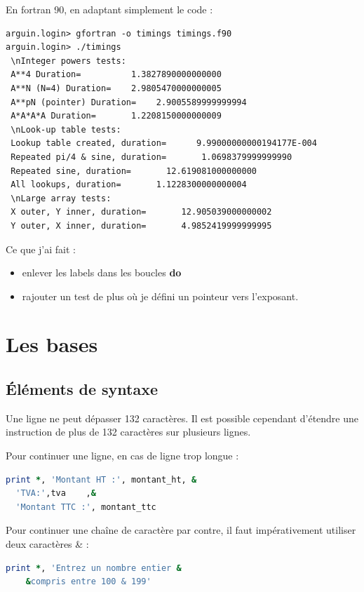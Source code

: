 \documentclass[a4paper,twoside]{article}
\begin{document}
En fortran 90, en adaptant simplement le code :
\begin{verbatim}
arguin.login> gfortran -o timings timings.f90
arguin.login> ./timings 
 \nInteger powers tests:
 A**4 Duration=          1.3827890000000000     
 A**N (N=4) Duration=    2.9805470000000005     
 A**pN (pointer) Duration=    2.9005589999999994     
 A*A*A*A Duration=       1.2208150000000009     
 \nLook-up table tests:
 Lookup table created, duration=      9.99000000000194177E-004
 Repeated pi/4 & sine, duration=       1.0698379999999990     
 Repeated sine, duration=       12.619081000000000     
 All lookups, duration=       1.1228300000000004     
 \nLarge array tests:
 X outer, Y inner, duration=       12.905039000000002     
 Y outer, X inner, duration=       4.9852419999999995  
\end{verbatim}
Ce que j'ai fait : 
\begin{itemize}
\item enlever les labels dans les boucles \textbf{do}
\item rajouter un test de plus où je défini un pointeur vers l'exposant. 
\end{itemize}



\section{Les bases}
\subsection{Éléments de syntaxe}
Une ligne ne peut dépasser 132 caractères. Il est possible cependant d'étendre une instruction de plus de 132 caractères sur plusieurs lignes.

Pour continuer une ligne, en cas de ligne trop longue : 
\begin{lstlisting}[language=Fortran]
print *, 'Montant HT :', montant_ht, & 
  'TVA:',tva	,&
  'Montant TTC :', montant_ttc
\end{lstlisting}

\bigskip

Pour continuer une chaîne de caractère par contre, il faut impérativement utiliser deux caractères \og \& \fg : 
\begin{lstlisting}[language=Fortran]
print *, 'Entrez un nombre entier & 
	&compris entre 100 & 199'
\end{lstlisting}

\bigskip
\end{document}
